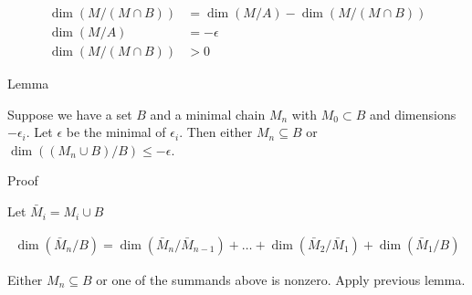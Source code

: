 \documentclass{amsart}
\begin{document}
\begin{align*}
	\dim(M / (M \cap B)) &= \dim (M/A) - \dim(M / (M \cap B)) \\
	\dim (M/A) &= -\epsilon \\
	\dim(M / (M \cap B)) &> 0
\end{align*}


Lemma

Suppose we have a set $B$ and a minimal chain $M_n$ with $M_0 \subset B$ and dimensions $-\epsilon_i$.
Let $\epsilon$ be the minimal of $\epsilon_i$.
Then either $M_n \subseteq B$ or $\dim((M_n \cup B)/B) \leq -\epsilon$.

Proof

Let $\bar M_i = M_i \cup B$

\begin{align*}
	\dim(\bar M_n/B) = \dim(\bar M_n/\bar M_{n-1}) + \ldots + \dim(\bar M_2/\bar M_1) + \dim(\bar M_1/B)
\end{align*}

Either $M_n \subseteq B$ or one of the summands above is nonzero.
Apply previous lemma.
\end{document}
